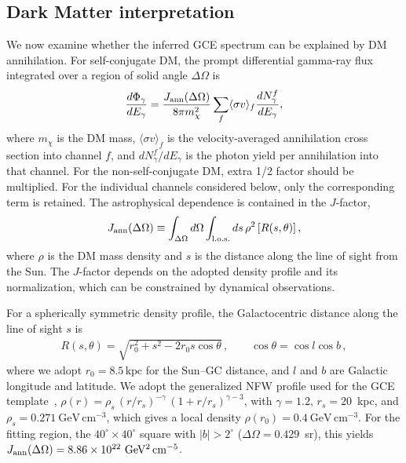 \documentclass[superscriptaddress,
showpacs,preprintnumbers,nofootinbib,eqsecnum,amsmath,amssymb,aps,11pt, groupedaddress, floatfix]{revtex4-2}
\begin{document}
\subsection{Dark Matter interpretation}


We now examine whether the inferred GCE spectrum can be explained by DM annihilation.
For self-conjugate DM, the prompt differential gamma-ray flux integrated over a region of solid angle $\Delta\Omega$ is
\begin{align}
\frac{d\Phi_\gamma}{dE_\gamma}
=
\frac{J_{\rm ann}(\Delta\Omega)}{8\pi m_\chi^2}
\sum_f \langle\sigma v\rangle_f
\frac{dN_\gamma^f}{dE_\gamma},
\label{eq:annihilation formula}
\end{align}
where $m_\chi$ is the DM mass, $\langle\sigma v\rangle_f$ is the velocity-averaged annihilation cross section into channel $f$, and $dN_\gamma^f/dE_\gamma$ is the photon yield per annihilation into that channel.
For the non-self-conjugate DM, extra 1/2 factor should be multiplied.
For the individual channels considered below, only the corresponding term is retained.
The astrophysical dependence is contained in the $J$-factor,
\begin{align}
J_{\rm ann}(\Delta\Omega)
\equiv
\int_{\Delta\Omega} d\Omega
\int_{\rm l.o.s.} ds\,\rho^2\left[R(s,\theta)\right],
\label{eq:J-factor}
\end{align}
where $\rho$ is the DM mass density and $s$ is the distance along the line of sight from the Sun.
The $J$-factor depends on the adopted density profile and its normalization, which can be constrained by dynamical observations.

For a spherically symmetric density profile, the Galactocentric distance along the line of sight $s$ is
\begin{align}
R(s,\theta)
=
\sqrt{r_0^2+s^2-2r_0s\cos\theta}\,,
\qquad
\cos\theta=\cos l\cos b\,,
\end{align}
where we adopt $r_0=8.5\,\mathrm{kpc}$ for the Sun--GC distance, and $l$ and $b$ are Galactic longitude and latitude.
We adopt the generalized NFW profile used for the GCE template~\cite{Navarro1996, Cholis:2021rpp}, $\rho(r)=\rho_s\,(r/r_s)^{-\gamma}\,(1+r/r_s)^{\gamma-3}$, with $\gamma=1.2$, $r_s=20$~kpc, and $\rho_s=0.271~\mathrm{GeV\,cm^{-3}}$, which gives a local density $\rho(r_0)=0.4~\mathrm{GeV\,cm^{-3}}$. For the fitting region, the $40^\circ\times40^\circ$ square with $|b|>2^\circ$ ($\Delta\Omega=0.429$~sr), this yields $J_{\rm ann}(\Delta\Omega)=8.86\times10^{22}~\mathrm{GeV^2\,cm^{-5}}$.
\end{document}
